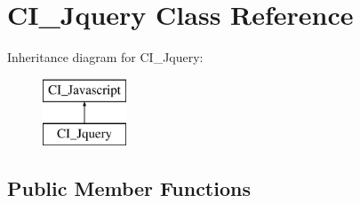 \section{C\-I\-\_\-\-Jquery Class Reference}
\label{class_c_i___jquery}
Inheritance diagram for C\-I\-\_\-\-Jquery\-:\begin{figure}[H]
\begin{center}
\leavevmode
\includegraphics[height=2.000000cm]{class_c_i___jquery}
\end{center}
\end{figure}
\subsection*{Public Member Functions}
